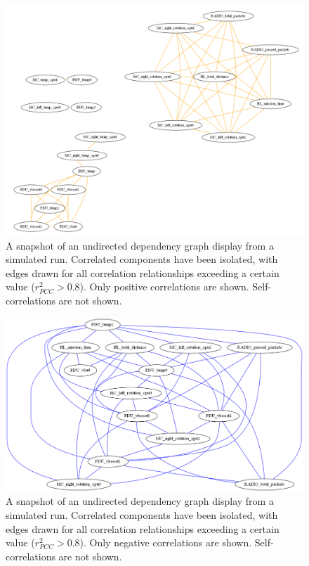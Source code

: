 \begin{figure}[h]
\centering
    \includegraphics[width=\columnwidth]{images/undirected_positive_only.png}
    \caption{A snapshot of an undirected dependency graph display from a simulated run. Correlated components have been isolated, with edges drawn for all correlation relationships exceeding a certain value ($r_{PCC}^{2} > 0.8$). Only positive correlations are shown. Self-correlations are not shown.}
    \label{fig:undirected_positive_only}
\end{figure}

\begin{figure}[h]
\centering
    \includegraphics[width=\columnwidth]{images/undirected_negative_only.png}
    \caption{A snapshot of an undirected dependency graph display from a simulated run. Correlated components have been isolated, with edges drawn for all correlation relationships exceeding a certain value ($r_{PCC}^{2} > 0.8$). Only negative correlations are shown. Self-correlations are not shown.}
    \label{fig:undirected_negative_only}
\end{figure}

